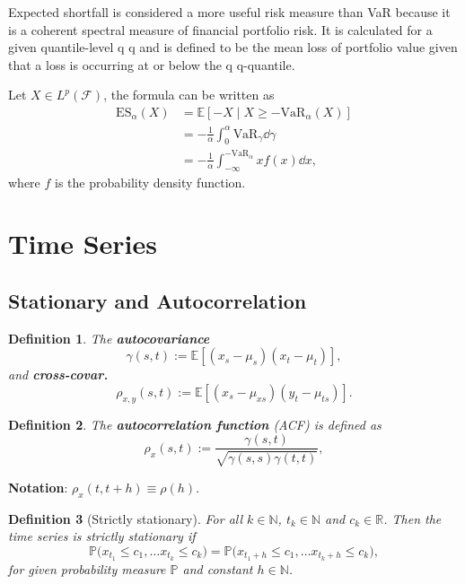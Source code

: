 \documentclass[10pt]{article}
\theoremstyle{remark}
\theoremstyle{plain}
\newtheorem{Definition}{Definition}[section]
\newcommand{\R}{\mathbb{R}}
\newcommand{\N}{\mathbb{N}}
\numberwithin{equation}{section}
\renewcommand{\leq}{\leqslant}
\renewcommand{\geq}{\geqslant}
\begin{document}
Expected shortfall is considered a more useful risk measure than VaR because it is a coherent spectral measure of financial portfolio risk. It is calculated for a given quantile-level q q and is defined to be the mean loss of portfolio value given that a loss is occurring at or below the q q-quantile.

Let $X \in L^p (\mathcal{F})$, the formula can be written as
\begin{align*}
	\text{ES}_\alpha (X) &= \mathbb{E} [-X \mid X \geq - \text{VaR}_\alpha(X)]
	\\
	& = - \frac{1}{\alpha} \int_0^\alpha \text{VaR}_\gamma \dd{\gamma}
	\\
	& =  - \frac{1}{\alpha} \int^{-\text{VaR}_\alpha}_{-\infty} x f(x) \dd{x},
\end{align*}
where $f$ is the probability density function.
%
%
\clearpage
\section{Time Series}


\subsection{Stationary and Autocorrelation}

\begin{Definition}
	The \textbf{autocovariance} $$\gamma (s,t) := \mathds{E} \left[(x_s - \mu_s) (x_t-\mu_t)\right],$$ and \textbf{cross-covar.} $$\rho_{x,y}(s,t):= \mathds{E}\left[(x_s - \mu_{xs})(y_t - \mu_{ts})\right].$$
\end{Definition}

\begin{Definition}
	The \textbf{autocorrelation function} (ACF) is defined as
	\[
	\rho_{x} (s,t)  := \frac{\gamma(s,t)}{\sqrt{\gamma(s,s)\gamma(t,t)}},
	\]
\end{Definition}

\textbf{Notation}: $\rho_{x}(t, t+h)  \equiv \rho(h)$.

\begin{Definition}[Strictly stationary]
	For all $k \in \N$, $t_k \in \N$ and $c_k \in \R$. Then the time series is strictly stationary if
	\[
	\mathds{P} \big(x_{t_1} \leq c_1, \dots x_{t_k} \leq c_k \big) = \mathds{P} \big(x_{t_1+h} \leq c_1, \dots x_{t_k+h} \leq c_k \big),
	\]
	for given probability measure $\mathds{P}$ and constant $h \in \N$.
\end{Definition}
\end{document}
